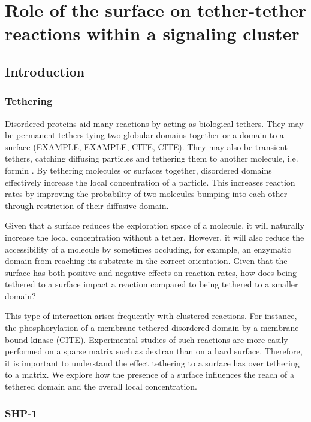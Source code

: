 \documentclass[../../AdvancementSummary.tex]{subfiles}
\begin{document}
\section{Role of the surface on tether-tether reactions within a signaling cluster}

\subsection{Introduction}
\subsubsection{Tethering}

Disordered proteins aid many reactions by acting as biological tethers. They may be permanent tethers tying two globular domains together or a domain to a surface (EXAMPLE, EXAMPLE, CITE, CITE). They may also be transient tethers, catching diffusing particles and tethering them to another molecule, i.e. formin \cite{Bryant2017}. By tethering molecules or surfaces together, disordered domains effectively increase the local concentration of a particle. This increases reaction rates by improving the probability of two molecules bumping into each other through restriction of their diffusive domain.

Given that a surface reduces the exploration space of a molecule, it will naturally increase the local concentration without a tether. However, it will also reduce the accessibility of a molecule by sometimes occluding, for example, an enzymatic domain from reaching its substrate in the correct orientation. Given that the surface has both positive and negative effects on reaction rates, how does being tethered to a surface impact a reaction compared to being tethered to a smaller domain? 

This type of interaction arises frequently with clustered reactions. For instance, the phosphorylation of a membrane tethered disordered domain by a membrane bound kinase (CITE). Experimental studies of such reactions are more easily performed on a sparse matrix such as dextran than on a hard surface. Therefore, it is important to understand the effect tethering to a surface has over tethering to a matrix. We explore how the presence of a surface influences the reach of a tethered domain and the overall local concentration.

\subsubsection{SHP-1}
\end{document}
